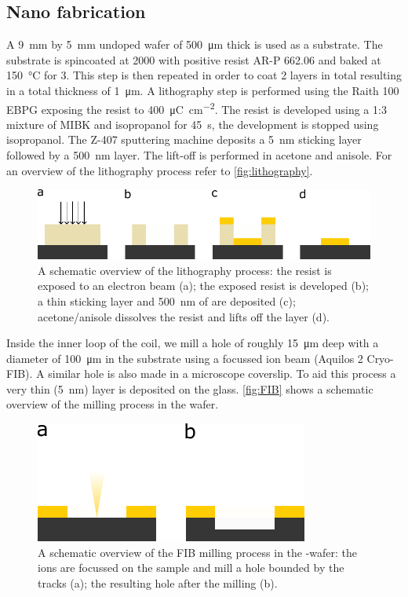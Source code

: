 \subsection{Nano fabrication}
\label{subsec:nanofabrication}
A \qty{9}{\mm} by \qty{5}{\mm} undoped  wafer of \qty{500}{\um} thick is used as a substrate. The substrate is spincoated at \qty{2000}{\rpm} with positive resist AR-P 662.06 and baked at \qty{150}{\celsius} for \qty{3}{\min}. This step is then repeated in order to coat 2 layers in total resulting in a total thickness of \qty{1}{\um}. A lithography step is performed using the Raith 100 EBPG exposing the resist to \qty{400}{\micro\coulomb\per\square\cm}. The resist is developed using a 1:3 mixture of MIBK and isopropanol for \qty{45}{\s}, the development is stopped using isopropanol. The Z-407 sputtering machine deposits a \qty{5}{\nm}  sticking layer followed by a \qty{500}{\nm}  layer. The lift-off is performed in acetone and anisole. For an overview of the lithography process refer to \autoref{fig:lithography}.

\begin{figure}[h]
    \centering
    \includegraphics{figures/lithography.pdf}
    \caption{A schematic overview of the lithography process: the resist is exposed to an electron beam (a); the exposed resist is developed (b); a thin sticking layer and \qty{500}{\nano\meter} of  are deposited (c); acetone/anisole dissolves the resist and lifts off the  layer (d).}
    \label{fig:lithography}
\end{figure}

Inside the inner loop of the coil, we mill a hole of roughly \qty{15}{\um} deep with a diameter of \qty{100}{\um} in the  substrate using a  focussed ion beam (Aquilos 2 Cryo-FIB). A similar hole is also made in a microscope coverslip. To aid this process a very thin (\qty{5}{\nano\meter})  layer is deposited on the glass. \autoref{fig:FIB} shows a schematic overview of the milling process in the wafer.

\begin{figure}[h]
    \centering
    \includegraphics{figures/FIB.pdf}
    \caption{A schematic overview of the FIB milling process in the -wafer: the  ions are focussed on the sample and mill a hole bounded by the tracks (a); the resulting hole after the milling (b).}
    \label{fig:FIB}
\end{figure}

